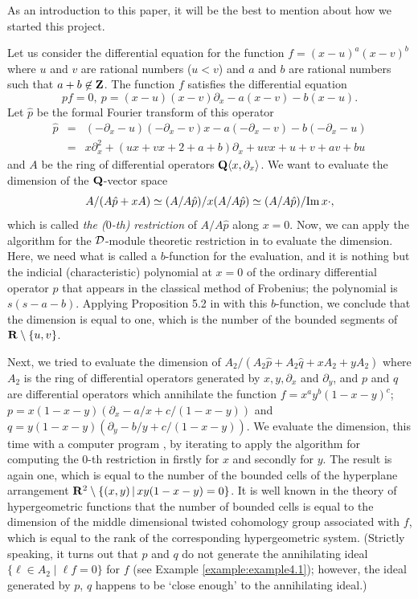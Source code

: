 \documentclass[12pt]{article}
\def\pd#1{ \partial_{#1} }
\def\Q{{\bf Q}}
\def\R{ {\bf R}}
\def\Z{ {\bf Z} }
\def\Dsc{ {\cal D} }
\begin{document}
\medbreak

As an introduction to this paper,
it will be the best to mention about
how we started this project.

Let us consider the differential equation for the function
$f = (x-u)^a(x-v)^b $
where $u$ and $v$ are rational numbers ($u < v$) and $a$ and $b$ are
rational numbers such that $a+b \not\in \Z$.
The function $f$ satisfies the differential equation
$$ p f = 0,  \  p = (x-u) (x-v) \pd{x} - a (x-v) - b(x-u). $$
Let ${\hat p}$ be the formal Fourier transform of this operator
\begin{eqnarray*}
 {\hat p} &=& (-\pd{x}-u) (-\pd{x}-v) x - a (-\pd{x}-v) - b (-\pd{x}-u)  \\
          &=& x \pd{x}^2 + (ux+vx+2+a+b)\pd{x} + uvx + u + v + av + bu 
\end{eqnarray*}
and $A$ be the ring of differential operators $\Q \langle x, \pd{x} \rangle$.
We want to evaluate the dimension of the $\Q$-vector space
$$ A/(A {\hat p} + x A) \simeq (A/A {\hat p})/x (A/A {\hat p}) \simeq
  (A/A {\hat p})/ {\rm Im}\, x \cdot, $$
which is called  {\it the {\rm (}$0$-th{\rm )} restriction} of $A/A {\hat p}$ along
$x=0$.
Now, we can apply the algorithm for the $\Dsc$-module theoretic restriction 
in \cite[Section 5]{OakuAdvance}
to evaluate the dimension.  Here, we need what is called a $b$-function 
for the evaluation,  
and it is nothing but the indicial (characteristic) polynomial at $x=0$ of
the ordinary differential operator ${\hat p}$ that appears in the classical
method of Frobenius; 
the polynomial is $ s (s - a - b)$.
Applying Proposition 5.2 in \cite{OakuAdvance} with this $b$-function,
we conclude that the dimension is equal to one,
which is the number of the bounded segments of
$ \R \setminus \{u, v\}$.

Next, we tried to evaluate the dimension of
$ A_2 / (A_2 {\hat p} + A_2 {\hat q} + x A_2 + y A_2) $
where $A_2$ is the ring of differential operators generated by
$x, y, \pd{x}$ and $\pd{y}$, 
and
$p$ and $q$ are differential operators which annihilate the function
$f = x^a y^b (1-x-y)^c$;
$ p = x(1-x-y) (\pd{x} - a/x + c/(1-x-y)) $ and
$ q = y(1-x-y) (\pd{y} - b/y + c/(1-x-y)) $.
We evaluate the dimension, this time with a computer program \cite{Kan-sm1},
by iterating to apply the algorithm 
for computing the $0$-th restriction in \cite{OakuAdvance} 
firstly for $x$ and secondly for $y$.
The result is again one, which is equal to the number of
the bounded cells of the hyperplane arrangement
$ \R^2 \setminus \{ (x,y)\,|\, x y (1-x-y) = 0  \}$.
It is well known in the theory of hypergeometric functions that
the number of bounded cells is equal to the dimension of
the middle dimensional twisted cohomology group associated with $f$, 
which is equal to
the rank of the corresponding hypergeometric system.
(Strictly speaking, it turns out that $p$ and $q$ do not generate 
the annihilating ideal $\{\ell\in A_2 \mid \ell f = 0\}$ for $f$
(see Example \ref{example:example4.1}); 
however, the ideal generated by $p$, $q$ 
happens to be `close enough' to the annihilating ideal.)
\end{document}
